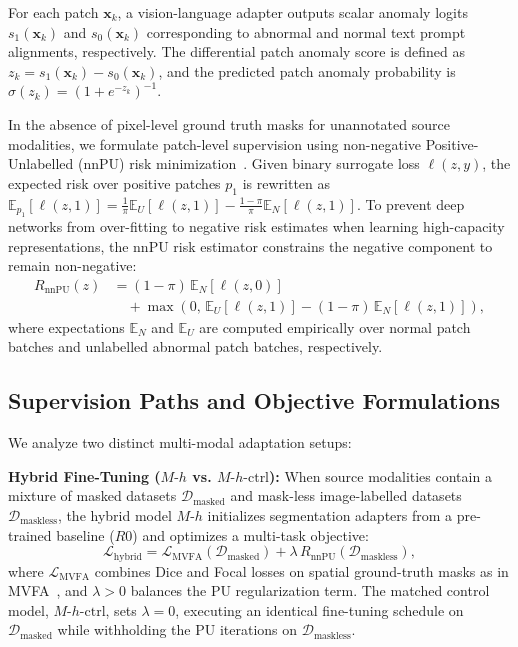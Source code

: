 \documentclass[10pt,twocolumn,letterpaper]{article}
\begin{document}
For each patch $\mathbf{x}_k$, a vision-language adapter outputs scalar anomaly logits $s_1(\mathbf{x}_k)$ and $s_0(\mathbf{x}_k)$ corresponding to abnormal and normal text prompt alignments, respectively. The differential patch anomaly score is defined as $z_k = s_1(\mathbf{x}_k) - s_0(\mathbf{x}_k)$, and the predicted patch anomaly probability is $\sigma(z_k) = (1 + e^{-z_k})^{-1}$.

In the absence of pixel-level ground truth masks for unannotated source modalities, we formulate patch-level supervision using non-negative Positive-Unlabelled (nnPU) risk minimization~\cite{kiryo2017nnpu}. Given binary surrogate loss $\ell(z, y)$, the expected risk over positive patches $p_1$ is rewritten as $\mathbb{E}_{p_1}[\ell(z, 1)] = \frac{1}{\pi}\mathbb{E}_U[\ell(z, 1)] - \frac{1-\pi}{\pi}\mathbb{E}_N[\ell(z, 1)]$. To prevent deep networks from over-fitting to negative risk estimates when learning high-capacity representations, the nnPU risk estimator constrains the negative component to remain non-negative:
\begin{equation}
\begin{aligned}
    R_{\text{nnPU}}(z) &= (1 - \pi) \, \mathbb{E}_N \left[ \ell(z, 0) \right] \\
    &\quad + \max \left( 0, \, \mathbb{E}_U \left[ \ell(z, 1) \right] - (1 - \pi) \, \mathbb{E}_N \left[ \ell(z, 1) \right] \right),
\end{aligned}
\label{eq:nnpu_risk}
\end{equation}
where expectations $\mathbb{E}_N$ and $\mathbb{E}_U$ are computed empirically over normal patch batches and unlabelled abnormal patch batches, respectively.

\subsection{Supervision Paths and Objective Formulations}
We analyze two distinct multi-modal adaptation setups:

\noindent\textbf{Hybrid Fine-Tuning ($M\text{-}h$ vs. $M\text{-}h\text{-ctrl}$):} When source modalities contain a mixture of masked datasets $\mathcal{D}_{\text{masked}}$ and mask-less image-labelled datasets $\mathcal{D}_{\text{maskless}}$, the hybrid model $M\text{-}h$ initializes segmentation adapters from a pre-trained baseline ($R0$) and optimizes a multi-task objective:
\begin{equation}
    \mathcal{L}_{\text{hybrid}} = \mathcal{L}_{\text{MVFA}}(\mathcal{D}_{\text{masked}}) + \lambda \, R_{\text{nnPU}}(\mathcal{D}_{\text{maskless}}),
    \label{eq:hybrid_loss}
\end{equation}
where $\mathcal{L}_{\text{MVFA}}$ combines Dice and Focal losses on spatial ground-truth masks as in MVFA~\cite{huang2024mvfa}, and $\lambda > 0$ balances the PU regularization term. The matched control model, $M\text{-}h\text{-ctrl}$, sets $\lambda = 0$, executing an identical fine-tuning schedule on $\mathcal{D}_{\text{masked}}$ while withholding the PU iterations on $\mathcal{D}_{\text{maskless}}$.
\end{document}
